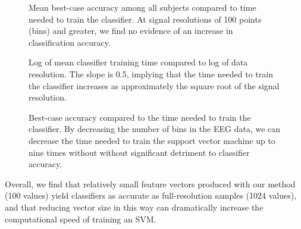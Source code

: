 \begin{figure}[!h]
  \centering
   {}
  \caption{Mean best-case accuracy among all subjects compared to time needed to train the classifier. At signal resolutions of 100 points (bins) and greater, we find no evidence of an increase in classification accuracy. }
  \label{fig:accuracy_vs_bins}
  \vspace{-0.1cm}
 \end{figure}

 \begin{figure}[!h]
  \vspace{-0.2cm}
  \centering
   {}
  \caption{Log of mean classifier training time compared to log of data resolution. The slope is 0.5, implying that the time needed to train the classifier increases as approximately the square root of the signal resolution.}
  \label{fig:training_vs_bins}
  \vspace{-0.1cm}
 \end{figure}

\begin{figure}[!h]
  \vspace{-0.2cm}
  \centering
   {}
  \caption{ Best-case accuracy compared to the time needed to train the classifier. By decreasing the number of bins in the EEG data, we can decrease the time needed to train the support vector machine up to nine times without without significant detriment to classifier accuracy. }
  \label{fig:accuracy_vs_training}
 \end{figure}

Overall, we find that relatively small feature vectors produced with our method (100 values) yield classifiers as accurate as full-resolution samples (1024 values), and that reducing vector size in this way can dramatically increase the computational speed of training an SVM. 
